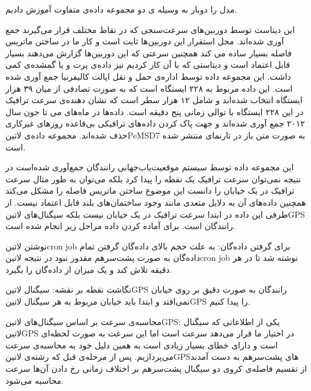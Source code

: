
مدل را دوبار به وسیله ی دو مجموعه داده‌ی متفاوت آموزش دادیم.

این دیتاست توسط دوربین‌های سرعت‌سنجی که در نقاط مختلف قرار می‌گیرند جمع آوری شده‌اند. محل استقرار این دوربین‌ها ثابت است و کار ما در ساختن ماتریس فاصله بسیار ساده می کند همچنین سرعتی که این دوربین‌ها گزارش می‌دهند بسیار قابل اعتماد است و دیتاستی که با آن کار کردیم نیز داده‌ی پرت و یا گمشده‌ی کمی داشت. این مجموعه داده توسط اداره‌ی حمل و نقل ایالت کالیفرنیا جمع آوری شده است.
این داده مربوط به ۲۲۸ ایستگاه است که به صورت تصادفی از میان ۳۹ هزار ایستگاه‌ انتخاب شده‌اند و شامل ۱۲ هزار سطر است که نشان دهنده‌ی سرعت ترافیک در این ۲۲۸ ایستگاه با توالی زمانی پنج دقیقه است.
داده‌ها در ماه‌های می تا جون سال ۲۰۱۲ جمع آوری شده‌اند و جهت پاک کردن داده‌های ترافیکی بی‌قاعده روزهای غیرکاری حذف شده‌اند.
مجموعه داده‌ی ‌لاتین{PeMSD7} به صورت متن باز در تارنمای  منتشر شده است.


این مجموعه داده توسط سیستم موقعیت‌‌یاب‌جهانی رانندگان جمع‌آوری شده‌است در نتیجه نمی‌توان سرعت ترافیک یک نقطه را پیدا کرد بلکه می‌توان
به طور مثال سرعت ترافیک در یک خیابان را دانست این موضوع ساختن ماتریس فاصله را مشکل می‌کند همچنین داده‌های آن به دلایل متعدی مانند
وجود ساختمان‌های بلند قابل اعتماد نیست. از طرفی این داده در ابتدا سرعت ترافیک در یک خیابان نیست بلکه سیگنال‌های ‌لاتین{GPS} رانندگان است. برای آماده کردن داده مراحل زیر انجام شده است.


 نوشتن ‌لاتین{cron job} برای گرفتن داده‌گان: به علت حجم بالای داده‌گان گرفتن تمام داده‌گان به صورت پشت‌سر‌هم مقدور نبود
در نتیجه ‌لاتین{cron job} نوشته شد تا در هر دقیقه تلاش کند و یک میزان از داده‌گان را بگیرد.

 نگاشت نقطه بر نقشه: سیگنال ‌لاتین{GPS} رانندگان به صورت دقیق بر روی خیابان نمی‌افتد و ابتدا باید خیابان مربوط به هر سیگنال ‌لاتین{‌GPS} را پیدا کنیم.

 محاسبه‌ی سرعت بر اساس سیگنال‌های ‌لاتین{GPS}: یکی از اطلاعاتی که سیگنال ‌لاتین{GPS} در اختیار ما قرار می‌دهد سرعت است اما این سرعت به صورت لحظه‌ای است و دارای خطای بسیار زیادی است به همین دلیل خود به محاسبه‌ی سرعت می‌پردازیم. پس از مرحله‌ی قبل که رشته‌ی ‌لاتین{GPS}های پشت‌سر‌هم به دست آمدند از تقسیم فاصله‌ی کروی دو سیگنال پشت‌سر‌هم بر اختلاف زمانی رخ دادن آن‌ها سرعت محاسبه می‌شود.


